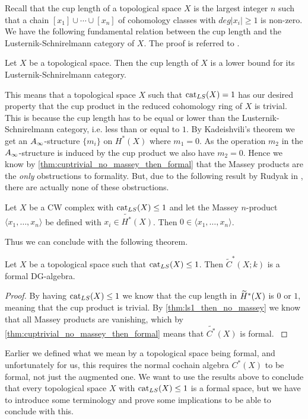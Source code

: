 Recall that the cup length of a topological space $X$ is the largest integer $n$ such that a chain $[x_1]\cup \cdots \cup [x_n]$ of cohomology classes with $deg|x_i|\geq 1$ is non-zero. We have the following fundamental relation between the cup length and the Lusternik-Schnirelmann category of $X$. The proof is referred to \cite{lscategorybook}.

\begin{lemma}
Let $X$ be a topological space. Then the cup length of $X$ is a lower bound for its Lusternik-Schnirelmann category. 
\end{lemma}

This means that a topological space $X$ such that $\text{cat}_{LS}(X)=1$ has our desired property that the cup product in the reduced cohomology ring of $X$ is trivial. This is because the cup length has to be equal or lower than the Lusternik-Schnirelmann category, i.e. less than or equal to $1$. By Kadeishvili's theorem we get an $A_{\infty}$-structure $\{m_i\}$ on $H^*(X)$ where $m_1 =0$. As the operation $m_2$ in the $A_{\infty}$-structure is induced by the cup product we also have $m_2=0$. Hence we know by \ref{thm:cuptrivial_no_massey_then_formal} that the Massey products are the \emph{only} obstructions to formality. But, due to the following result by Rudyak in \cite[Lemma 4.6]{Rudyak}, there are actually none of these obstructions. 

\begin{theorem}
Let $X$ be a CW complex with $\text{cat}_{LS}(X)\leq 1$ and let the Massey $n$-product $\langle x_1, \ldots, x_n\rangle$ be defined with $x_i \in \widetilde{H^*}(X)$. Then $0\in \langle x_1, \ldots, x_n\rangle $.
\label{thm:ls1_then_no_massey}
\end{theorem}

Thus we can conclude with the following theorem. 

\begin{theorem}
Let $X$ be a topological space such that $\text{cat}_{LS}(X)\leq 1$. Then $\widetilde{C}^*(X;k)$ is a formal DG-algebra.
\end{theorem}
\begin{proof}
By having $\text{cat}_{LS}(X)\leq 1$ we know that the cup length in $\widetilde{H}^*(X)$ is $0$ or $1$, meaning that the cup product is trivial. By \cref{thm:ls1_then_no_massey} we know that all Massey products are vanishing, which by  \cref{thm:cuptrivial_no_massey_then_formal} means that $\widetilde{C^*}(X)$ is formal.
\label{thm:ls1_then_reduced_formal}
\end{proof}


Earlier we defined what we mean by a topological space being formal, and unfortunately for us, this requires the normal cochain algebra $C^*(X)$ to be formal, not just the augmented one. We want to use the results above to conclude that every topological space $X$ with $\text{cat}_{LS}(X)\leq 1$ is a formal space, but we have to introduce some terminology and prove some implications to be able to conclude with this. 

